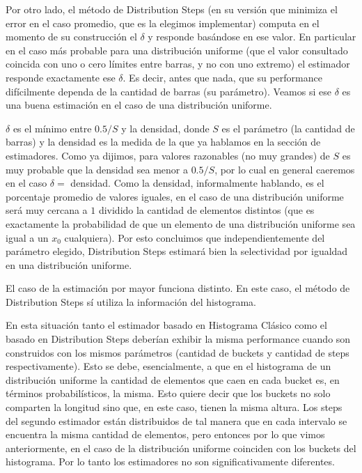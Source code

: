 Por otro lado, el método de Distribution Steps (en su versión que minimiza el error en el caso promedio, que es la elegimos implementar) computa en el momento de su construcción el $\delta$ y responde basándose en ese valor. En particular en el caso más probable para una distribución uniforme (que el valor consultado coincida con uno o cero límites entre barras, y no con uno extremo) el estimador responde exactamente ese $\delta$. Es decir, antes que nada, que su performance difícilmente dependa de la cantidad de barras (su parámetro). Veamos si ese $\delta$ es una buena estimación en el caso de una distribución uniforme.

$\delta$ es el mínimo entre $0.5/S$ y la densidad, donde $S$ es el parámetro (la cantidad de barras) y la densidad es la medida de la que ya hablamos en la sección de estimadores. Como ya dijimos, para valores razonables (no muy grandes) de $S$ es muy probable que la densidad sea menor a $0.5/S$, por lo cual en general caeremos en el caso $\delta = $ densidad. Como la densidad, informalmente hablando, es el porcentaje promedio de valores iguales, en el caso de una distribución uniforme será muy cercana a $1$ dividido la cantidad de elementos distintos (que es exactamente la probabilidad de que un elemento de una distribución uniforme sea igual a un $x_0$ cualquiera). Por esto concluimos que independientemente del parámetro elegido, Distribution Steps estimará bien la selectividad por igualdad en una distribución uniforme.

El caso de la estimación por mayor funciona distinto. En este caso, el método de Distribution Steps sí utiliza la información del histograma.


En esta situación tanto el estimador basado en Histograma Clásico como el basado en Distribution Steps deberían exhibir la misma performance cuando son construidos con los mismos parámetros (cantidad de buckets y cantidad de steps respectivamente). Esto se debe, esencialmente, a que en el histograma de un distribución uniforme la cantidad de elementos que caen en cada bucket es, en términos probabilísticos, la misma. Esto quiere decir que los buckets no solo comparten la longitud sino que, en este caso, tienen la misma altura. Los steps del segundo estimador están distribuidos de tal manera que en cada intervalo se encuentra la misma cantidad de elementos, pero entonces por lo que vimos anteriormente, en el caso de la distribución uniforme coinciden con los buckets del histograma. Por lo tanto los estimadores no son significativamente diferentes.